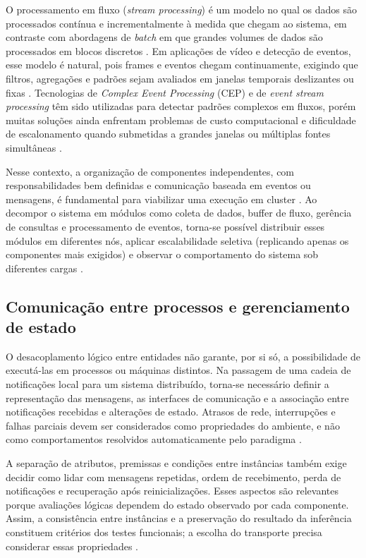 O processamento em fluxo (\textit{stream processing}) é um modelo no qual os dados são processados contínua e incrementalmente à medida que chegam ao sistema, em contraste com abordagens de \textit{batch} em que grandes volumes de dados são processados em blocos discretos \cite{alam2020}. Em aplicações de vídeo e detecção de eventos, esse modelo é natural, pois frames e eventos chegam continuamente, exigindo que filtros, agregações e padrões sejam avaliados em janelas temporais deslizantes ou fixas \cite{kossoski2024applsci}. Tecnologias de \textit{Complex Event Processing} (CEP) e de \textit{event stream processing} têm sido utilizadas para detectar padrões complexos em fluxos, porém muitas soluções ainda enfrentam problemas de custo computacional e dificuldade de escalonamento quando submetidas a grandes janelas ou múltiplas fontes simultâneas \cite{kossoski2024applsci,alam2020}.

Nesse contexto, a organização de componentes independentes, com responsabilidades bem definidas e comunicação baseada em eventos ou mensagens, é fundamental para viabilizar uma execução em cluster \cite{burns2019,kubernetes2026documentation}. Ao decompor o sistema em módulos como coleta de dados, buffer de fluxo, gerência de consultas e processamento de eventos, torna-se possível distribuir esses módulos em diferentes nós, aplicar escalabilidade seletiva (replicando apenas os componentes mais exigidos) e observar o comportamento do sistema sob diferentes cargas \cite{burns2019}.



\subsection{Comunicação entre processos e gerenciamento de estado}
\label{sec:comunicacao-estado-distribuido}

O desacoplamento lógico entre entidades não garante, por si só, a possibilidade de executá-las em processos ou máquinas distintos. Na passagem de uma cadeia de notificações local para um sistema distribuído, torna-se necessário definir a representação das mensagens, as interfaces de comunicação e a associação entre notificações recebidas e alterações de estado. Atrasos de rede, interrupções e falhas parciais devem ser considerados como propriedades do ambiente, e não como comportamentos resolvidos automaticamente pelo paradigma \cite{tanenbaum2017,burns2019}.

A separação de atributos, premissas e condições entre instâncias também exige decidir como lidar com mensagens repetidas, ordem de recebimento, perda de notificações e recuperação após reinicializações. Esses aspectos são relevantes porque avaliações lógicas dependem do estado observado por cada componente. Assim, a consistência entre instâncias e a preservação do resultado da inferência constituem critérios dos testes funcionais; a escolha do transporte precisa considerar essas propriedades \cite{tanenbaum2017}.

